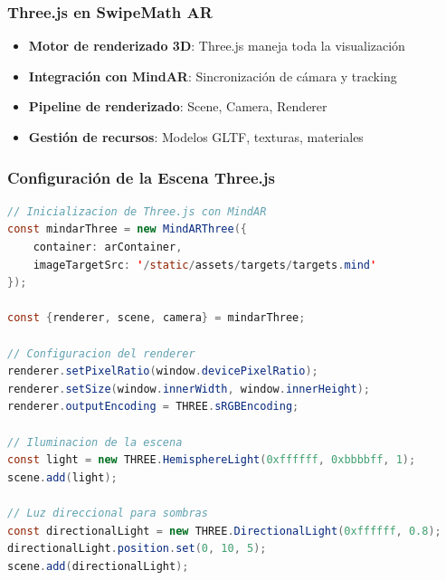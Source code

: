 \documentclass{beamer}
\begin{document}
\begin{frame}
\frametitle{Three.js en SwipeMath AR}
\begin{itemize}
    \item<1-> \textbf{Motor de renderizado 3D}: Three.js maneja toda la visualización
    \item<2-> \textbf{Integración con MindAR}: Sincronización de cámara y tracking
    \item<3-> \textbf{Pipeline de renderizado}: Scene, Camera, Renderer
    \item<4-> \textbf{Gestión de recursos}: Modelos GLTF, texturas, materiales
\end{itemize}

\end{frame}

\begin{frame}[fragile]
\frametitle{Configuración de la Escena Three.js}
\begin{lstlisting}[language=Java, basicstyle=\tiny]
// Inicializacion de Three.js con MindAR
const mindarThree = new MindARThree({
    container: arContainer,
    imageTargetSrc: '/static/assets/targets/targets.mind'
});

const {renderer, scene, camera} = mindarThree;

// Configuracion del renderer
renderer.setPixelRatio(window.devicePixelRatio);
renderer.setSize(window.innerWidth, window.innerHeight);
renderer.outputEncoding = THREE.sRGBEncoding;

// Iluminacion de la escena
const light = new THREE.HemisphereLight(0xffffff, 0xbbbbff, 1);
scene.add(light);

// Luz direccional para sombras
const directionalLight = new THREE.DirectionalLight(0xffffff, 0.8);
directionalLight.position.set(0, 10, 5);
scene.add(directionalLight);
\end{lstlisting}
\end{frame}
\end{document}
